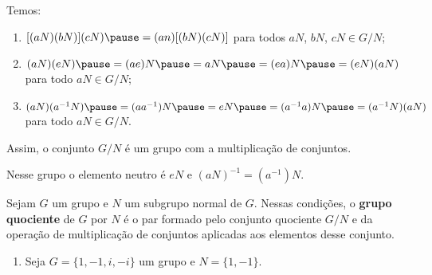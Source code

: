 \documentclass{beamer}
\begin{document}
    \begin{frame}
        Temos: \pause

        \vspace{.3cm}

        \begin{enumerate}[label={\roman*})]
            \item $[(aN)(bN)](cN) \pause = (an)[(bN)(cN)]$ \pause para todos $aN$, $bN$, $cN \in G/N$; \pause

            \vspace{.3cm}

            \item $(aN)(eN) \pause = (ae)N \pause = aN \pause = (ea)N \pause = (eN)(aN)$ \pause para todo $aN \in G/N$; \pause

            \vspace{.3cm}

            \item $(aN)(a^{-1}N) \pause = (aa^{-1})N \pause = eN \pause = (a^{-1}a)N \pause = (a^{-1}N)(aN)$ \pause para todo $aN \in G/N$. \pause

            \vspace{.3cm}
        \end{enumerate}

        Assim, o conjunto $G/N$ é um grupo com a multiplicação de conjuntos. \pause

        \vspace{.3cm}

        Nesse grupo o elemento neutro é $eN$ \pause e $(aN)^{-1} = (a^{-1})N$.
    \end{frame}

    \begin{frame}
        \begin{definicao}
            Sejam $G$ um grupo e $N$ um subgrupo normal de $G$. \pause Nessas condições, \pause o \textbf{grupo quociente} \pause
            de $G$ por $N$ \pause é o par formado pelo conjunto quociente $G/N$ \pause e da operação de multiplicação de conjuntos
            aplicadas aos elementos desse conjunto.
        \end{definicao}
    \end{frame}

    \begin{frame}
        \begin{exemplos}
            \begin{enumerate}[label=({\arabic*})]
                \item Seja $G = \{1, -1, i, -i\}$ um grupo \pause e $N = \{1, -1\}$.

                \seti
            \end{enumerate}
        \end{exemplos}
    \end{frame}
\end{document}
